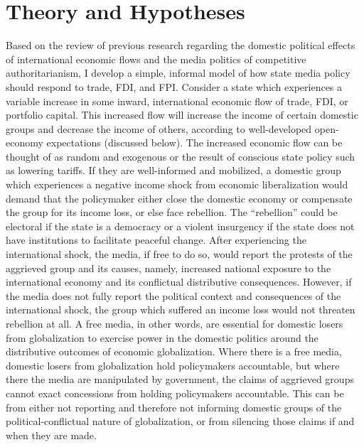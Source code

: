 \documentclass[12pt,a4paper]{article}\usepackage[]{graphicx}\usepackage[]{color}
\begin{document}
\section{Theory and Hypotheses}

Based on the review of previous research regarding the domestic political effects of international economic flows and the media politics of competitive authoritarianism, I develop a simple, informal model of how state media policy should respond to trade, FDI, and FPI. Consider a state which experiences a variable increase in some inward, international economic flow of trade, FDI, or portfolio capital. This increased flow will increase the income of certain domestic groups and decrease the income of others, according to well-developed open-economy expectations (discussed below). The increased economic flow can be thought of as random and exogenous or the result of conscious state policy such as lowering tariffs. If they are well-informed and mobilized, a domestic group which experiences a negative income shock from economic liberalization would demand that the policymaker either close the domestic economy or compensate the group for its income loss, or else face rebellion. The “rebellion” could be electoral if the state is a democracy or a violent insurgency if the state does not have institutions to facilitate peaceful change. After experiencing the international shock, the media, if free to do so, would report the protests of the aggrieved group and its causes, namely, increased national exposure to the international economy and its conflictual distributive consequences. However, if the media does not fully report the political context and consequences of the international shock, the group which suffered an income loss would not threaten rebellion at all. A free media, in other words, are essential for domestic losers from globalization to exercise power in the domestic politics around the distributive outcomes of economic globalization. Where there is a free media, domestic losers from globalization hold policymakers accountable, but where there the media are manipulated by government, the claims of aggrieved groups cannot exact concessions from holding policymakers accountable. This can be from either not reporting and therefore not informing domestic groups of the political-conflictual nature of globalization, or from silencing those claims if and when they are made.
\end{document}
